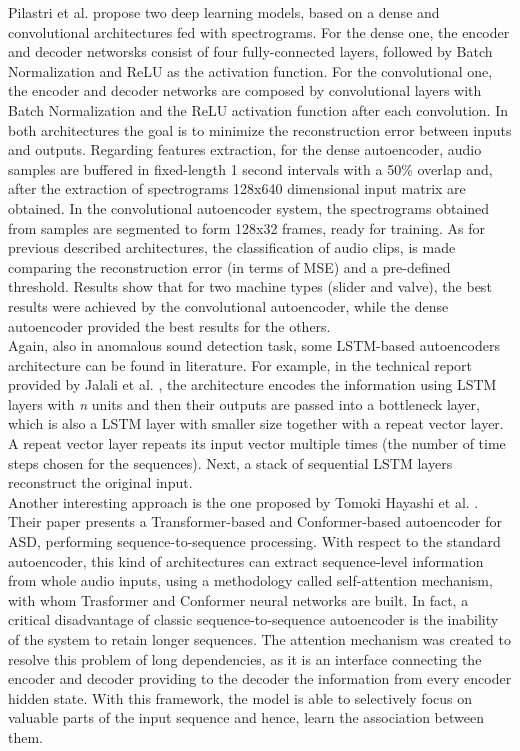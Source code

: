 Pilastri et al. \cite{15DeepDenseConvAE} propose two deep learning models, based on a dense and convolutional architectures fed with spectrograms. For the dense one, the encoder and decoder networsks consist of four fully-connected layers, followed by Batch Normalization and ReLU as the activation function. For the convolutional one, the encoder and decoder networks are composed by convolutional layers with Batch Normalization and the ReLU activation function after each convolution. In both architectures the goal is to minimize the reconstruction error between inputs and outputs. Regarding features extraction, for the dense autoencoder, audio samples are buffered in fixed-length 1 second intervals with a 50\% overlap and, after the extraction of spectrograms 128x640 dimensional input matrix are obtained. In the convolutional autoencoder system, the spectrograms obtained from samples are segmented to form 128x32 frames, ready for training. As for previous described architectures, the classification of audio clips, is made comparing the reconstruction error (in terms of MSE) and a pre-defined threshold. Results show that for two machine types (slider and valve), the best results were achieved by the convolutional autoencoder, while the dense autoencoder provided the best results for the others.\\
Again, also in anomalous sound detection task, some LSTM-based autoencoders architecture can be found in literature. For example, in the technical report provided by Jalali et al. \cite{16LSTMDeepAutoencodersForASDtask}, the architecture encodes the information using LSTM layers with \textit{n} units and then their outputs are passed into a bottleneck layer, which is also a LSTM layer with smaller size together with a repeat vector layer. A repeat vector layer repeats its input vector multiple times (the number of time steps chosen for the sequences). Next, a stack of sequential LSTM layers reconstruct the original input.\\
Another interesting approach is the one proposed by Tomoki Hayashi et al. \cite{17ConformerBasedIDAWAREAutoencoder}. Their paper presents a Transformer-based and Conformer-based autoencoder for ASD, performing sequence-to-sequence processing. With respect to the standard autoencoder, this kind of architectures can extract sequence-level information from whole audio inputs, using a methodology called self-attention mechanism, with whom Trasformer and Conformer neural networks are built. In fact, a critical disadvantage of classic sequence-to-sequence autoencoder is the inability of the system to retain longer sequences. The attention mechanism was created to resolve this problem of long dependencies, as it is an interface connecting the encoder and decoder providing to the decoder the information from every encoder hidden state. With this framework, the model is able to selectively focus on valuable parts of the input sequence and hence, learn the association between them.\\
